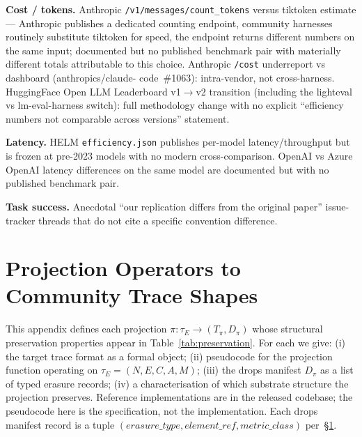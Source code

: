 \documentclass{article}
\begin{document}
\textbf{Cost / tokens.} Anthropic
\texttt{/v1/messages/count\_tokens} versus tiktoken estimate
--- Anthropic publishes a dedicated counting endpoint,
community harnesses routinely substitute tiktoken for speed,
the endpoint returns different numbers on the same input;
documented but no published benchmark pair with materially
different totals attributable to this choice. Anthropic
\texttt{/cost} underreport vs dashboard (anthropics/claude-%
code~\#1063): intra-vendor, not cross-harness. HuggingFace
Open LLM Leaderboard v1$\to$v2 transition (including the
lighteval vs lm-eval-harness switch): full methodology change
with no explicit ``efficiency numbers not comparable across
versions'' statement.

\textbf{Latency.} HELM \texttt{efficiency.json} publishes
per-model latency/throughput but is frozen at pre-2023 models
with no modern cross-comparison. OpenAI vs Azure OpenAI
latency differences on the same model are documented but with
no published benchmark pair.

\textbf{Task success.} Anecdotal ``our replication differs
from the original paper'' issue-tracker threads that do not
cite a specific convention difference.


\section{Projection Operators to Community Trace Shapes}
\label{app:projections}

This appendix defines each projection
$\pi: \tau_E \to (T_\pi, D_\pi)$ whose structural preservation
properties appear in Table~\ref{tab:preservation}. For each we
give: (i) the target trace format as a formal object;
(ii) pseudocode for the projection function operating on
$\tau_E = (N, E, C, A, M)$; (iii) the drops manifest $D_\pi$ as
a list of typed erasure records; (iv) a characterisation of which
substrate structure the projection preserves. Reference
implementations are in the released codebase; the pseudocode here
is the specification, not the implementation. Each drops manifest
record is a tuple
$(\textit{erasure\_type}, \textit{element\_ref},
\textit{metric\_class})$ per~\S\ref{app:projections}.
\end{document}
